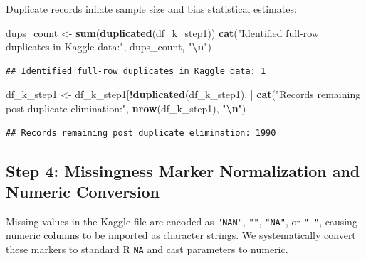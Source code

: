\documentclass[
]{article}
\newenvironment{Shaded}{\begin{snugshade}}{\end{snugshade}}
\newcommand{\FunctionTok}[1]{\textcolor[rgb]{0.13,0.29,0.53}{\textbf{#1}}}
\newcommand{\NormalTok}[1]{#1}
\newcommand{\OtherTok}[1]{\textcolor[rgb]{0.56,0.35,0.01}{#1}}
\newcommand{\SpecialCharTok}[1]{\textcolor[rgb]{0.81,0.36,0.00}{\textbf{#1}}}
\newcommand{\StringTok}[1]{\textcolor[rgb]{0.31,0.60,0.02}{#1}}
\begin{document}
Duplicate records inflate sample size and bias statistical estimates:

\begin{Shaded}
\begin{Highlighting}[]
\NormalTok{dups\_count }\OtherTok{\textless{}{-}} \FunctionTok{sum}\NormalTok{(}\FunctionTok{duplicated}\NormalTok{(df\_k\_step1))}
\FunctionTok{cat}\NormalTok{(}\StringTok{"Identified full{-}row duplicates in Kaggle data:"}\NormalTok{, dups\_count, }\StringTok{"}\SpecialCharTok{\textbackslash{}n}\StringTok{"}\NormalTok{)}
\end{Highlighting}
\end{Shaded}

\begin{verbatim}
## Identified full-row duplicates in Kaggle data: 1
\end{verbatim}

\begin{Shaded}
\begin{Highlighting}[]
\NormalTok{df\_k\_step1 }\OtherTok{\textless{}{-}}\NormalTok{ df\_k\_step1[}\SpecialCharTok{!}\FunctionTok{duplicated}\NormalTok{(df\_k\_step1), ]}
\FunctionTok{cat}\NormalTok{(}\StringTok{"Records remaining post duplicate elimination:"}\NormalTok{, }\FunctionTok{nrow}\NormalTok{(df\_k\_step1), }\StringTok{"}\SpecialCharTok{\textbackslash{}n}\StringTok{"}\NormalTok{)}
\end{Highlighting}
\end{Shaded}

\begin{verbatim}
## Records remaining post duplicate elimination: 1990
\end{verbatim}

\subsection{Step 4: Missingness Marker Normalization and Numeric
Conversion}\label{step-4-missingness-marker-normalization-and-numeric-conversion}

Missing values in the Kaggle file are encoded as \texttt{"NAN"},
\texttt{""}, \texttt{"NA"}, or \texttt{"-"}, causing numeric columns to
be imported as character strings. We systematically convert these
markers to standard R \texttt{NA} and cast parameters to numeric.
\end{document}
